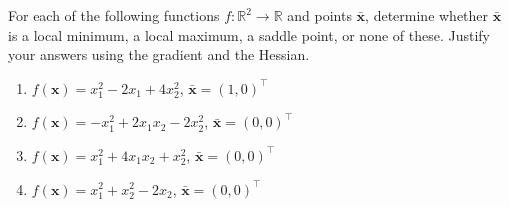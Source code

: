 \begin{exercise} %
    
    For each of the following functions $f: \mathbb{R}^2 \to \mathbb{R}$ and points $\bar{\mathbf{x}}$, determine whether $\bar{\mathbf{x}}$ is a local minimum, a local maximum, a saddle point, or none of these. Justify your answers using the gradient and the Hessian.
    \begin{enumerate}[label=(\alph*)]
        \item $f(\mathbf{x}) = x_1^2 - 2x_1 + 4x_2^2$, \quad $\bar{\mathbf{x}} = (1, 0)^\top$
        \item $f(\mathbf{x}) = -x_1^2 + 2x_1 x_2 - 2x_2^2$, \quad $\bar{\mathbf{x}} = (0, 0)^\top$
        \item $f(\mathbf{x}) = x_1^2 + 4x_1 x_2 + x_2^2$, \quad $\bar{\mathbf{x}} = (0, 0)^\top$
        \item $f(\mathbf{x}) = x_1^2 + x_2^2 - 2x_2$, \quad $\bar{\mathbf{x}} = (0, 0)^\top$
    \end{enumerate}
    
\end{exercise}

